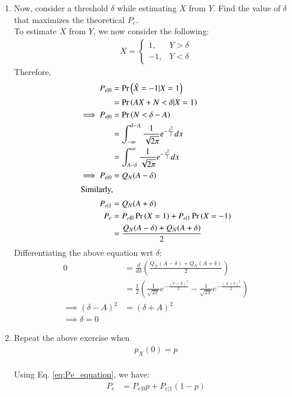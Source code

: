 \documentclass[journal,12pt,twocolumn]{IEEEtran}
\renewcommand\thesection{\arabic{section}}
\begin{document}
\begin{enumerate}[label=\thesection.\arabic*
,ref=\thesection.\theenumi]
\begin{enumerate}[label=\thesection.\arabic*
,ref=\thesection.\theenumi]
\begin{figure}[!h]
\caption{$P_e(A)$ with semilog-y axis}
\label{fig:5.6}
\end{figure}
\item Now, consider a threshold $\delta$  while estimating $X$ from $Y$. Find the value of $\delta$ that maximizes the theoretical $P_e$.
\\
\solution
To estimate $X$ from $Y$, we now consider the following:
\begin{align}
    X = 
    \begin{cases}
        1, & Y > \delta \\
        -1, & Y < \delta
    \end{cases}
\end{align}
Therefore,
\begin{align}
P_{e|0} &= \Pr\left(\hat{X} = -1 | X = 1\right) \\
&= \Pr\left(AX+N < \delta | X = 1\right) \\
\implies P_{e|0}&= \Pr\left(N < \delta - A\right) \\
&= \int _{-\infty} ^{\delta - A} \frac{1}{\sqrt{2\pi}} e^{-\frac{x^2}{2}} dx \\
&= \int _{A - \delta} ^{\infty} \frac{1}{\sqrt{2\pi}} e^{-\frac{x^2}{2}} dx \\
\implies P_{e|0}&= Q_N(A - \delta) \\
\intertext{Similarly,}
P_{e|1} &= Q_N(A+\delta) \\
\label{eq:Pe_equation}
P_e &= P_{e|0} \Pr\left(X = 1\right) + P_{e|1} \Pr\left(X = -1\right) \\
&= \frac{Q_N(A - \delta) + Q_N(A + \delta)}{2} 
\end{align}
Differentiating the above equation wrt $\delta$:
\begin{align}
0 &= \frac{d}{d\delta} \left(\frac{Q_N(A - \delta) + Q_N(A + \delta)}{2}\right) \\
&= \frac{1}{2} \left(\frac{1}{\sqrt{2\pi}} e^{-\frac{(\delta - A)^2}{2}} - \frac{1}{\sqrt{2\pi}} e^{-\frac{(A + \delta)^2}{2}} \right) \\
\implies(\delta - A)^2 &= (\delta + A)^2 \\
\implies \boxed{\delta = 0}
\end{align}
\item Repeat the above exercise when 
    \begin{align}
        p_{X}(0) = p
    \end{align}
\\
\solution
Using Eq. \eqref{eq:Pe_equation}, we have:
\begin{align}
    P_e &= P_{e|0} p+ P_{e|1} (1-p) \\

\end{align}
\end{enumerate}
\end{enumerate}
\end{document}
